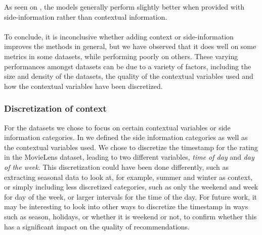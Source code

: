 As seen on , the models generally perform slightly better when provided with side-information rather than contextual information.
\\\\
To conclude, it is inconclusive whether adding context or side-information improves the methods in general, but we have observed that it does well on some metrics in some datasets, while performing poorly on others.
These varying performances amongst datasets can be due to a variety of factors, including the size and density of the datasets, the quality of the contextual variables used and how the contextual variables have been discretized.\\

\subsubsection{Discretization of context}
For the datasets we chose to focus on certain contextual variables or side information categories.
In  we defined the side information categories as well as the contextual variables used.
We chose to discretize the timestamp for the rating in the MovieLens dataset, leading to two different variables, \textit{time of day} and \textit{day of the week}.
This discretization could have been done differently, such as extracting seasonal data to look at, for example, summer and winter as context, or simply including less discretized categories, such as only the weekend and week for day of the week, or larger intervals for the time of the day.
For future work, it may be interesting to look into other ways to discretize the timestamp in ways such as season, holidays, or whether it is weekend or not, to confirm whether this has a significant impact on the quality of recommendations.

